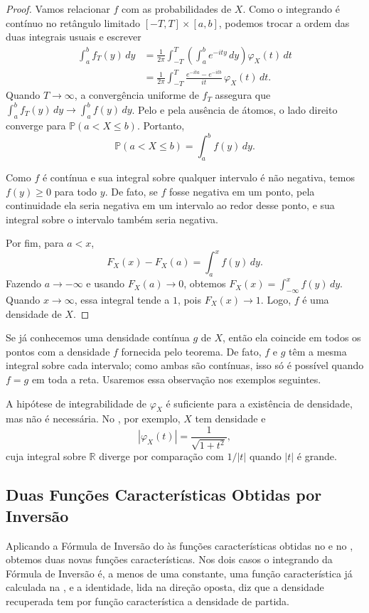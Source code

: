 \documentclass[12pt,portuguese]{article}
\theoremstyle{definition}
\theoremstyle{plainexercise}
\theoremstyle{starredexercise}
\theoremstyle{definition}
\begin{document}
\begin{proof}
Vamos relacionar $f$ com as probabilidades de $X$. Como o integrando é
contínuo no retângulo limitado $[-T,T]\times[a,b]$, podemos trocar a ordem
das duas integrais usuais e escrever
\begin{align*}
\int_a^b f_T(y)\,dy
&=\frac{1}{2\pi}\int_{-T}^{T}
\left(\int_a^b e^{-ity}\,dy\right)\varphi_X(t)\,dt\\[0.3cm]
&=\frac{1}{2\pi}\int_{-T}^{T}
\frac{e^{-ita}-e^{-itb}}{it}\,\varphi_X(t)\,dt.
\end{align*}
Quando $T\to\infty$, a convergência uniforme de $f_T$ assegura que
$\int_a^b f_T(y)\,dy\to\int_a^b f(y)\,dy$. Pelo
 e pela ausência de átomos, o lado
direito converge para $\mathbb{P}(a<X\leqslant b)$. Portanto,
\[
\mathbb{P}(a<X\leqslant b)=\int_a^b f(y)\,dy.
\]

Como $f$ é contínua e sua integral sobre qualquer intervalo é não negativa,
temos $f(y)\geqslant0$ para todo $y$. De fato, se $f$ fosse negativa em um
ponto, pela continuidade ela seria negativa em um intervalo ao redor desse
ponto, e sua integral sobre o intervalo também seria negativa. 

Por fim, para
$a<x$,
\[
F_X(x)-F_X(a)=\int_a^x f(y)\,dy.
\]
Fazendo $a\to-\infty$ e usando $F_X(a)\to0$, obtemos
$F_X(x)=\int_{-\infty}^x f(y)\,dy$. Quando $x\to\infty$, essa integral tende
a $1$, pois $F_X(x)\to1$. Logo, $f$ é uma densidade de $X$.
\end{proof}

Se já conhecemos uma densidade contínua $g$ de $X$, então ela coincide em
todos os pontos com a densidade $f$ fornecida pelo teorema. De fato, $f$ e
$g$ têm a mesma integral sobre cada intervalo; como ambas são contínuas,
isso só é possível quando $f=g$ em toda a reta. Usaremos essa observação nos
exemplos seguintes.

A hipótese de integrabilidade de $\varphi_X$ é suficiente para a existência de
densidade, mas não é necessária. No , por exemplo, $X$
tem densidade e
\[
|\varphi_X(t)|=\frac{1}{\sqrt{1+t^2}},
\]
cuja integral sobre $\mathbb{R}$ diverge por comparação com $1/|t|$ quando
$|t|$ é grande.

\subsection{Duas Funções Características Obtidas por Inversão}\label{subsec:exemplos-inversao}

Aplicando a Fórmula de Inversão do  às funções
características obtidas no  e no ,
obtemos duas novas funções características. Nos dois casos o integrando da Fórmula de
Inversão é, a menos de uma constante, uma função característica já calculada na
, e a identidade, lida na direção oposta, diz que a densidade
recuperada tem por função característica a densidade de partida.
\end{document}
